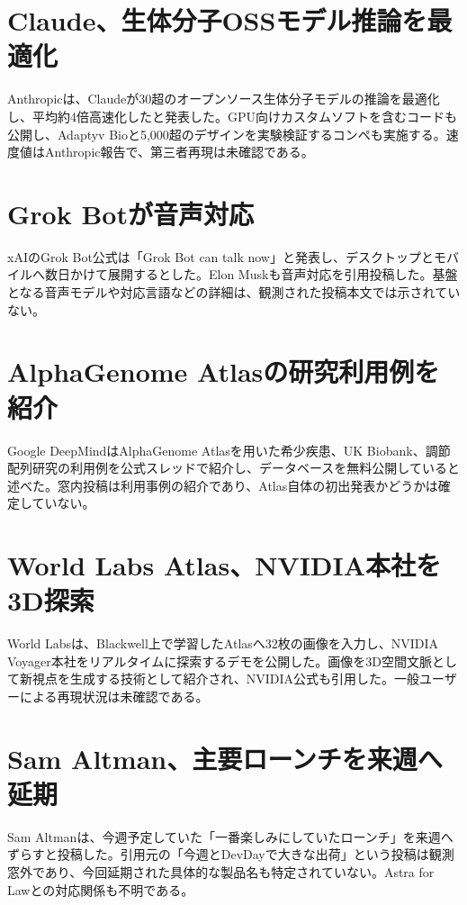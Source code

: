 \section{Claude、生体分子OSSモデル推論を最適化}
Anthropicは、Claudeが30超のオープンソース生体分子モデルの推論を最適化し、平均約4倍高速化したと発表した。GPU向けカスタムソフトを含むコードも公開し、Adaptyv Bioと5,000超のデザインを実験検証するコンペも実施する。速度値はAnthropic報告で、第三者再現は未確認である。

\section{Grok Botが音声対応}
xAIのGrok Bot公式は「Grok Bot can talk now」と発表し、デスクトップとモバイルへ数日かけて展開するとした。Elon Muskも音声対応を引用投稿した。基盤となる音声モデルや対応言語などの詳細は、観測された投稿本文では示されていない。

\section{AlphaGenome Atlasの研究利用例を紹介}
Google DeepMindはAlphaGenome Atlasを用いた希少疾患、UK Biobank、調節配列研究の利用例を公式スレッドで紹介し、データベースを無料公開していると述べた。窓内投稿は利用事例の紹介であり、Atlas自体の初出発表かどうかは確定していない。

\section{World Labs Atlas、NVIDIA本社を3D探索}
World Labsは、Blackwell上で学習したAtlasへ32枚の画像を入力し、NVIDIA Voyager本社をリアルタイムに探索するデモを公開した。画像を3D空間文脈として新視点を生成する技術として紹介され、NVIDIA公式も引用した。一般ユーザーによる再現状況は未確認である。

\section{Sam Altman、主要ローンチを来週へ延期}
Sam Altmanは、今週予定していた「一番楽しみにしていたローンチ」を来週へずらすと投稿した。引用元の「今週とDevDayで大きな出荷」という投稿は観測窓外であり、今回延期された具体的な製品名も特定されていない。Astra for Lawとの対応関係も不明である。

